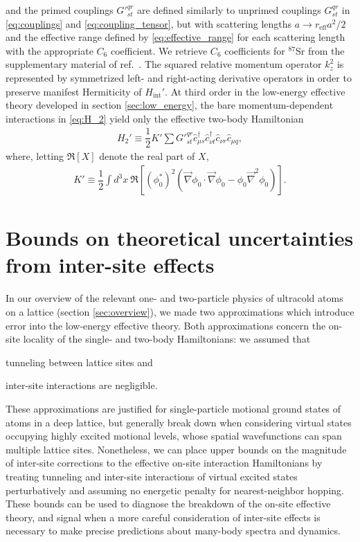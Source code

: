 \documentclass[preprint,showkeys,nofootinbib]{revtex4-1}
\renewcommand{\t}{\text} %
\newcommand{\f}{\dfrac} %
\newcommand{\p}[1]{\left(#1\right)} %
\renewcommand{\sp}[1]{\left[#1\right]} %
\renewcommand{\c}{\hat{c}}
\newcommand{\1}{\mathds{1}}
\begin{document}
and the primed couplings ${G'}^{qr}_{st}$ are defined similarly to
unprimed couplings $G^{qr}_{st}$ in \eqref{eq:couplings} and
\eqref{eq:coupling_tensor}, but with scattering lengths
$a\to r_{\t{eff}}a^2/2$ and the effective range defined by
\eqref{eq:effective_range} for each scattering length with the
appropriate $C_6$ coefficient.  We retrieve $C_6$ coefficients for
${}^{87}$Sr from the supplementary material of
ref.~\cite{zhang2014spectroscopic}.  The squared relative momentum
operator $k_z^2$ is represented by symmetrized left- and right-acting
derivative operators in order to preserve manifest Hermiticity of
$H_{\t{int}}'$.  At third order in the low-energy effective theory
developed in section \ref{sec:low_energy}, the bare momentum-dependent
interactions in \eqref{eq:H_2} yield only the effective two-body
Hamiltonian
\begin{align}
  H_2' \equiv \f12 K' \sum {G'}^{qr}_{st}
  \c_{\mu s}^\dag \c_{\nu t}^\dag \c_{\nu r} \c_{\mu q},
  \label{eq:H_2_prime}
\end{align}
where, letting $\Re\sp{X}$ denote the real part of $X$,
\begin{align}
  K' \equiv \f12 \int d^3x~
  \Re\sp{\p{\phi_0^*}^2
    \p{\vec\nabla\phi_0\cdot\vec\nabla\phi_0
      - \phi_0\vec\nabla^2\phi_0}}.
\end{align}


\section{Bounds on theoretical uncertainties from inter-site effects}
\label{sec:error}

In our overview of the relevant one- and two-particle physics of
ultracold atoms on a lattice (section \ref{sec:overview}), we made two
approximations which introduce error into the low-energy effective
theory.  Both approximations concern the on-site locality of the
single- and two-body Hamiltonians: we assumed that
\begin{enumerate*}[label=\roman*)]
\item tunneling between lattice sites and
\item inter-site interactions are negligible.
\end{enumerate*}
These approximations are justified for single-particle motional ground
states of atoms in a deep lattice, but generally break down when
considering virtual states occupying highly excited motional levels,
whose spatial wavefunctions can span multiple lattice sites.
Nonetheless, we can place upper bounds on the magnitude of inter-site
corrections to the effective on-site interaction Hamiltonians by
treating tunneling and inter-site interactions of virtual excited
states perturbatively and assuming no energetic penalty for
nearest-neighbor hopping.  These bounds can be used to diagnose the
breakdown of the on-site effective theory, and signal when a more
careful consideration of inter-site effects is necessary to make
precise predictions about many-body spectra and dynamics.
\end{document}
